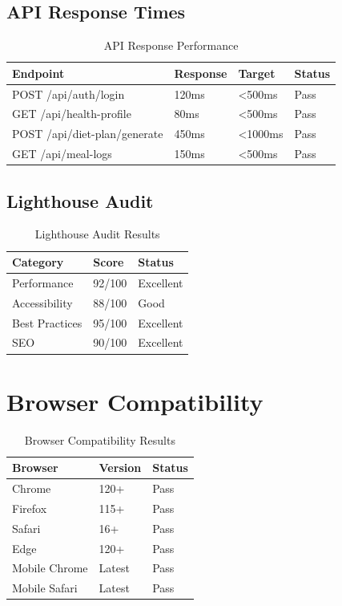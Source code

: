 \subsection{API Response Times}

\begin{table}[H]
\centering
\begin{tabular}{|l|l|l|l|}
\hline
\textbf{Endpoint} & \textbf{Response} & \textbf{Target} & \textbf{Status} \\
\hline
POST /api/auth/login & 120ms & <500ms & Pass \\
GET /api/health-profile & 80ms & <500ms & Pass \\
POST /api/diet-plan/generate & 450ms & <1000ms & Pass \\
GET /api/meal-logs & 150ms & <500ms & Pass \\
\hline
\end{tabular}
\caption{API Response Performance}
\end{table}

\subsection{Lighthouse Audit}

\begin{table}[H]
\centering
\begin{tabular}{|l|l|l|}
\hline
\textbf{Category} & \textbf{Score} & \textbf{Status} \\
\hline
Performance & 92/100 & Excellent \\
Accessibility & 88/100 & Good \\
Best Practices & 95/100 & Excellent \\
SEO & 90/100 & Excellent \\
\hline
\end{tabular}
\caption{Lighthouse Audit Results}
\end{table}

\section{Browser Compatibility}

\begin{table}[H]
\centering
\begin{tabular}{|l|l|l|}
\hline
\textbf{Browser} & \textbf{Version} & \textbf{Status} \\
\hline
Chrome & 120+ & Pass \\
Firefox & 115+ & Pass \\
Safari & 16+ & Pass \\
Edge & 120+ & Pass \\
Mobile Chrome & Latest & Pass \\
Mobile Safari & Latest & Pass \\
\hline
\end{tabular}
\caption{Browser Compatibility Results}
\end{table}

